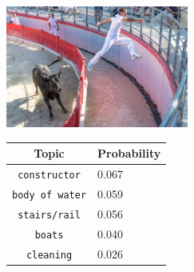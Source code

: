 \documentclass[twoside,twocolumn]{article}
\begin{document}
\begin{figure}
\begin{subfigure}{\textwidth}
    \centering
    \begin{minipage}[t][4cm]{.5\linewidth}
    \centering
    \vspace{0pt}
    \includegraphics[height=4cm]{Images/7446693604.jpg}
    \end{minipage}\hfill
    \begin{minipage}[t]{.5\textwidth}
    \centering
    \vspace{0pt}
    \begin{tabular}{cl}
            Topic                           & Probability\\
            \hline
            \texttt{constructor}             & 0.067 \\
            \texttt{body of water}                   & 0.059 \\
            \texttt{stairs/rail}                 & 0.056 \\
            \texttt{boats}           & 0.040 \\
            \texttt{cleaning}        & 0.026\\
            \hline
        \end{tabular}
    \end{minipage}
\end{subfigure}

\vspace*{4mm}


\end{figure}
\end{document}
